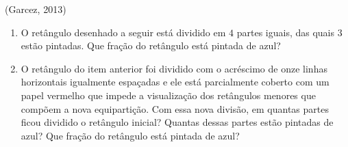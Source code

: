 \begin{atividade}{}\label{chap4-ativ3}

(Garcez, 2013)

\begin{enumerate}  %
  \item     O retângulo desenhado a seguir está dividido em     $4$ partes iguais, das quais     $3$ estão pintadas. Que fração do retângulo está pintada de azul?
  \begin{center}
\end{center}

\item     O retângulo do item anterior foi dividido com o acréscimo de onze linhas horizontais igualmente espaçadas e ele está parcialmente coberto com um papel vermelho que impede a visualização dos retângulos menores que compõem a nova equipartição. Com essa nova divisão, em quantas partes ficou dividido o retângulo inicial? Quantas dessas partes estão pintadas de azul? Que fração do retângulo está pintada de azul?  
\end{enumerate} %

\begin{center}
\end{center}
\end{atividade}
\clearpage

